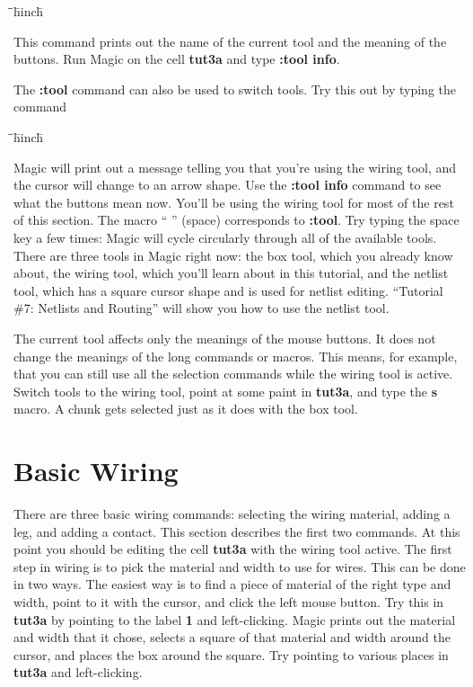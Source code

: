 \documentclass[letterpaper,twoside,12pt]{article}
\def\hinch{\hspace*{0.5in}}
\def\starti{\begin{center}\begin{tabbing}\hinch\=\hinch\=\hinch\=hinch\hinch\=\kill}
\def\endi{\end{tabbing}\end{center}}
\def\ii{\>\>\>}
\begin{document}
\starti
   \ii {\bfseries :tool info}
\endi

This command prints out the name of the current tool and the meaning
of the buttons.  Run Magic on the cell {\bfseries tut3a} and type {\bfseries :tool info}.

The {\bfseries :tool} command can also be used to switch tools.  Try this
out by typing the command

\starti
   \ii {\bfseries :tool}
\endi

Magic will print out a message telling you that you're using the
wiring tool, and the cursor will change to an arrow shape.  Use
the {\bfseries :tool info} command to see what the buttons mean now.  You'll
be using the wiring tool for most of the rest of this section.  The
macro `` '' (space) corresponds to {\bfseries :tool}.  Try typing the space key
a few times:  Magic will cycle circularly through all of the
available tools.  There are three tools in Magic right now:  the
box tool, which you already know about, the wiring tool, which
you'll learn about in this tutorial, and the netlist tool, which has a square
cursor shape and is used for netlist editing.  ``Tutorial \#7:
Netlists and Routing'' will show you how to use the netlist tool.

The current tool affects only the meanings of the mouse
buttons.  It does not change the meanings of the long commands
or macros.  This means, for example, that you can still use
all the selection commands while the wiring tool is active.
Switch tools to the wiring tool, point
at some paint in {\bfseries tut3a}, and type the {\bfseries s} macro.
A chunk gets selected just as it does with the box tool.

\section{Basic Wiring}

There are three basic wiring commands:  selecting the wiring  material,
adding a leg, and adding a contact.  This section describes the
first two commands.  At this point you should be editing the
cell {\bfseries tut3a} with the wiring tool active.  The first step
in wiring is to pick the material and width to use for wires.
This can be done in two ways.  The easiest way is to find a piece
of material of the right type and width, point to it with the
cursor, and click the left mouse button.  Try this in {\bfseries tut3a}
by pointing to the label {\bfseries 1} and left-clicking.  Magic prints out
the material and width that it chose, selects a square of that
material and width around the cursor, and places the box around
the square.  Try pointing to various places in {\bfseries tut3a} and
left-clicking.
\end{document}
